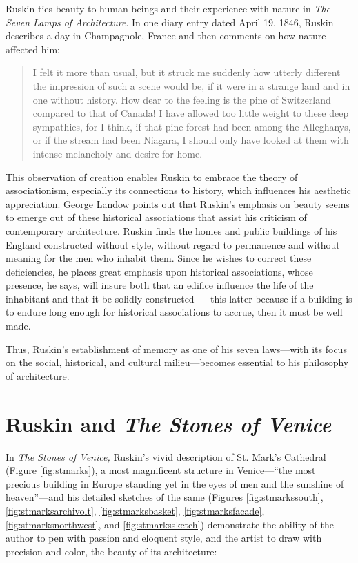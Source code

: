 Ruskin ties beauty to human beings and their experience with nature in
\textit{The Seven Lamps of Architecture}.  In one diary entry dated
April 19, 1846, Ruskin describes a day in Champagnole, France and then
comments on how nature affected him: 

\begin{quote}
I felt it more than usual, but it struck me suddenly how utterly
different the impression of such a scene would be, if it were in a
strange land and in one without history.  How dear to the feeling is
the pine of Switzerland compared to that of Canada!  I have allowed too
little weight to these deep sympathies, for I think, if that pine
forest had been among the Alleghanys, or if the stream had been
Niagara, I should only have looked at them with intense melancholy and
desire for home. \citep[][pg. 325]{ruskin1956}
\end{quote}

This observation of creation enables Ruskin to embrace the theory of
associationism, especially its connections to history, which influences
his aesthetic appreciation.  George Landow points out that Ruskin’s
emphasis on beauty seems to emerge out of these historical associations
that assist his criticism of contemporary architecture.  Ruskin finds the homes and
public buildings of his England constructed without style, without
regard to permanence and without meaning for the men who inhabit them. 
Since he wishes to correct these deficiencies, he places great emphasis
upon historical associations, whose presence, he says, will insure both
that an edifice influence the life of the inhabitant and that it be
solidly constructed — this latter because if a building is to endure
long enough for historical associations to accrue, then it must be well
made. 

Thus, Ruskin’s establishment of memory as one of his seven laws—with its
focus on the social, historical, and cultural milieu—becomes essential
to his philosophy of architecture. 

\section{Ruskin and \textit{The Stones of Venice}}


In \textit{The Stones of Venice,} Ruskin’s vivid description of St.
Mark’s Cathedral (Figure \ref{fig:stmarks}), a most magnificent structure in Venice---“the
most precious building in Europe standing yet in the eyes of men and
the sunshine of heaven”\citep{nyt1880}---and his detailed sketches of the
same (Figures \ref{fig:stmarkssouth}, \ref{fig:stmarksarchivolt}, \ref{fig:stmarksbasket}, \ref{fig:stmarksfacade}, \ref{fig:stmarksnorthwest}, and \ref{fig:stmarkssketch}) demonstrate the ability of the author to pen with
passion and eloquent style, and the artist to draw with precision and
color, the beauty of its architecture: 

